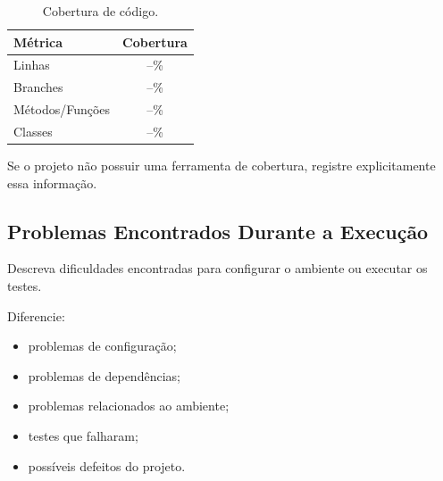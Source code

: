 \begin{table}[H]
\centering
\caption{Cobertura de código.}
\label{tab:cobertura}
\begin{tabular}{lc}
\toprule
\textbf{Métrica} & \textbf{Cobertura} \\
\midrule
Linhas & --\% \\
Branches & --\% \\
Métodos/Funções & --\% \\
Classes & --\% \\
\bottomrule
\end{tabular}
\end{table}

Se o projeto não possuir uma ferramenta de cobertura,
registre explicitamente essa informação.



\subsection{Problemas Encontrados Durante a Execução}

Descreva dificuldades encontradas para configurar o ambiente
ou executar os testes.

Diferencie:

\begin{itemize}
    \item problemas de configuração;
    \item problemas de dependências;
    \item problemas relacionados ao ambiente;
    \item testes que falharam;
    \item possíveis defeitos do projeto.
\end{itemize}
